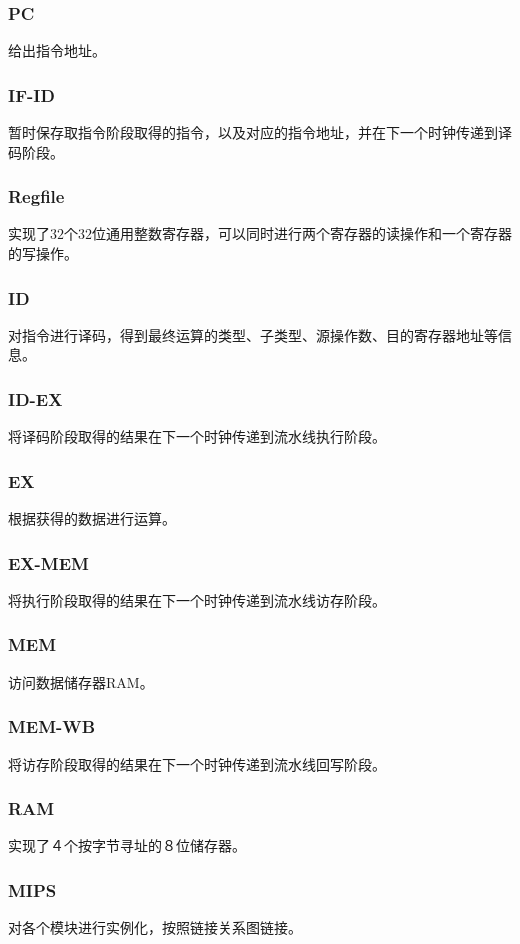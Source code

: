 	\subsubsection*{PC}
	给出指令地址。
	\subsubsection*{IF-ID}
	暂时保存取指令阶段取得的指令，以及对应的指令地址，并在下一个时钟传递到译码阶段。
	\subsubsection*{Regfile}
	实现了$32$个$32$位通用整数寄存器，可以同时进行两个寄存器的读操作和一个寄存器的写操作。
	\subsubsection*{ID}
	对指令进行译码，得到最终运算的类型、子类型、源操作数、目的寄存器地址等信息。
	\subsubsection*{ID-EX}
	将译码阶段取得的结果在下一个时钟传递到流水线执行阶段。
	\subsubsection*{EX}
	根据获得的数据进行运算。
	\subsubsection*{EX-MEM}
	将执行阶段取得的结果在下一个时钟传递到流水线访存阶段。
	\subsubsection*{MEM}
	访问数据储存器RAM。
	\subsubsection*{MEM-WB}
	将访存阶段取得的结果在下一个时钟传递到流水线回写阶段。
	\subsubsection*{RAM}
	实现了４个按字节寻址的８位储存器。
	\subsubsection*{MIPS}
	对各个模块进行实例化，按照链接关系图链接。


